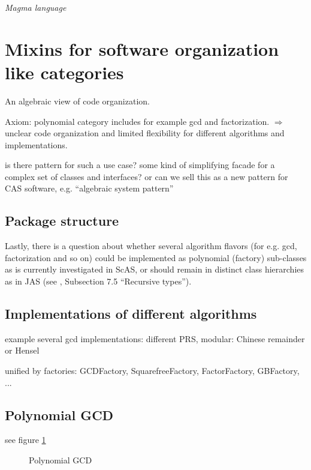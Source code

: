 \documentclass{llncs}
\begin{document}
{\em Magma language}



\section{Mixins for software organization like categories} %
\label{sec:mixin}

An algebraic view of code organization.

Axiom: polynomial category includes for example gcd and factorization.
$\Longrightarrow$ unclear code organization and limited flexibility for
different algorithms and implementations.

is there pattern \cite{Gamma:1995} for such a use case? some kind of
simplifying facade for a complex set of classes and interfaces? or can
we sell this as a new pattern for CAS software, e.g. ``algebraic system pattern'' 



\subsection{Package structure} %

Lastly, there is a question about whether several algorithm flavors
(for e.g. gcd, factorization and so on) could be implemented as
polynomial (factory) sub-classes as is currently investigated in ScAS,
or should remain in distinct class hierarchies as in JAS (see
\cite{Kredel:2008}, Subsection 7.5 ``Recursive types'').


\subsection{Implementations of different algorithms} %

example several gcd implementations: different PRS, modular: Chinese
remainder or Hensel

unified by factories:
GCDFactory, SquarefreeFactory, FactorFactory, GBFactory, ...

\subsection{Polynomial GCD} %

see figure \ref{fig:poly}

\begin{figure}[thb]
\centering
{}
\caption{Polynomial GCD}
\label{fig:poly}
\end{figure}
\end{document}
